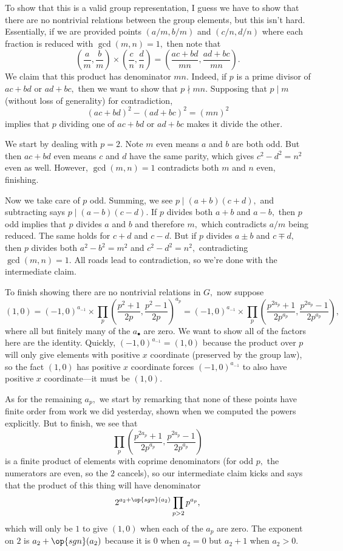 To show that this is a valid group representation, I guess we have to show that there are no nontrivial relations between the group elements, but this isn't hard. Essentially, if we are provided points $(a/m,b/m)$ and $(c/n,d/n)$ where each fraction is reduced with $\gcd(m,n)=1,$ then note that
\[\left(\frac am,\frac bm\right)\times\left(\frac cn,\frac dn\right)=\left(\frac{ac+bd}{mn},\frac{ad+bc}{mn}\right).\]
We claim that this product has denominator $mn.$ Indeed, if $p$ is a prime divisor of $ac+bd$ or $ad+bc,$ then we want to show that $p\nmid mn.$ Supposing that $p\mid m$ (without loss of generality) for contradiction,
\[(ac+bd)^2-(ad+bc)^2=(mn)^2\]
implies that $p$ dividing one of $ac+bd$ or $ad+bc$ makes it divide the other.

We start by dealing with $p=2.$ Note $m$ even means $a$ and $b$ are both odd. But then $ac+bd$ even means $c$ and $d$ have the same parity, which gives $c^2-d^2=n^2$ even as well. However, $\gcd(m,n)=1$ contradicts both $m$ and $n$ even, finishing.

Now we take care of $p$ odd. Summing, we see $p\mid(a+b)(c+d),$ and subtracting says $p\mid(a-b)(c-d).$ If $p$ divides both $a+b$ and $a-b,$ then $p$ odd implies that $p$ divides $a$ and $b$ and therefore $m,$ which contradicts $a/m$ being reduced. The same holds for $c+d$ and $c-d.$ But if $p$ divides $a\pm b$ and $c\mp d,$ then $p$ divides both $a^2-b^2=m^2$ and $c^2-d^2=n^2,$ contradicting $\gcd(m,n)=1.$ All roads lead to contradiction, so we're done with the intermediate claim.

To finish showing there are no nontrivial relations in $G,$ now suppose
\[(1,0)=(-1,0)^{a_{-1}}\times\prod_p\left(\frac{p^2+1}{2p},\frac{p^2-1}{2p}\right)^{a_p}=(-1,0)^{a_{-1}}\times\prod_p\left(\frac{p^{2a_p}+1}{2p^{a_p}},\frac{p^{2a_p}-1}{2p^{a_p}}\right),\]
where all but finitely many of the $a_\bullet$ are zero. We want to show all of the factors here are the identity. Quickly, $(-1,0)^{a_{-1}}=(1,0)$ because the product over $p$ will only give elements with positive $x$ coordinate (preserved by the group law), so the fact $(1,0)$ has positive $x$ coordinate forces $(-1,0)^{a_{-1}}$ to also have positive $x$ coordinate---it must be $(1,0).$

As for the remaining $a_p,$ we start by remarking that none of these points have finite order from work we did yesterday, shown when we computed the powers explicitly. But to finish, we see that
\[\prod_p\left(\frac{p^{2a_p}+1}{2p^{a_p}},\frac{p^{2a_p}-1}{2p^{a_p}}\right)\]
is a finite product of elements with coprime denominators (for odd $p,$ the numerators are even, so the $2$ cancels), so our intermediate claim kicks and says that the product of this thing will have denominator
\[2^{a_2+\op{sgn}(a_2)}\prod_{p>2}p^{a_p},\]
which will only be $1$ to give $(1,0)$ when each of the $a_p$ are zero. The exponent on $2$ is $a_2+\op{sgn}(a_2)$ because it is $0$ when $a_2=0$ but $a_2+1$ when $a_2>0.$

